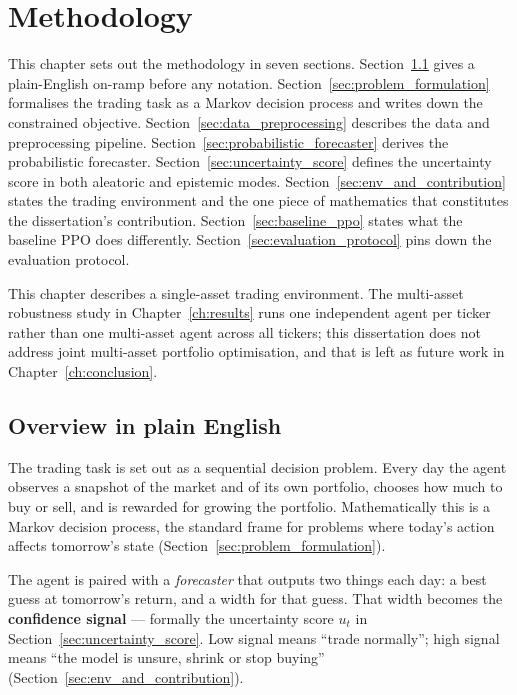 \chapter{Methodology}
\label{ch:methodology}

This chapter sets out the methodology in seven sections. Section~\ref{sec:methodology_overview} gives a plain-English on-ramp before any notation. Section~\ref{sec:problem_formulation} formalises the trading task as a Markov decision process and writes down the constrained objective. Section~\ref{sec:data_preprocessing} describes the data and preprocessing pipeline. Section~\ref{sec:probabilistic_forecaster} derives the probabilistic forecaster. Section~\ref{sec:uncertainty_score} defines the uncertainty score in both aleatoric and epistemic modes. Section~\ref{sec:env_and_contribution} states the trading environment and the one piece of mathematics that constitutes the dissertation's contribution. Section~\ref{sec:baseline_ppo} states what the baseline PPO does differently. Section~\ref{sec:evaluation_protocol} pins down the evaluation protocol.

This chapter describes a single-asset trading environment. The multi-asset robustness study in Chapter~\ref{ch:results} runs one independent agent per ticker rather than one multi-asset agent across all tickers; this dissertation does not address joint multi-asset portfolio optimisation, and that is left as future work in Chapter~\ref{ch:conclusion}.

\section{Overview in plain English}
\label{sec:methodology_overview}

The trading task is set out as a sequential decision problem. Every day the agent observes a snapshot of the market and of its own portfolio, chooses how much to buy or sell, and is rewarded for growing the portfolio. Mathematically this is a Markov decision process, the standard frame for problems where today's action affects tomorrow's state (Section~\ref{sec:problem_formulation}).

The agent is paired with a \emph{forecaster} that outputs two things each day: a best guess at tomorrow's return, and a width for that guess. That width becomes the \textbf{confidence signal} --- formally the uncertainty score $u_t$ in Section~\ref{sec:uncertainty_score}. Low signal means ``trade normally''; high signal means ``the model is unsure, shrink or stop buying'' (Section~\ref{sec:env_and_contribution}).

